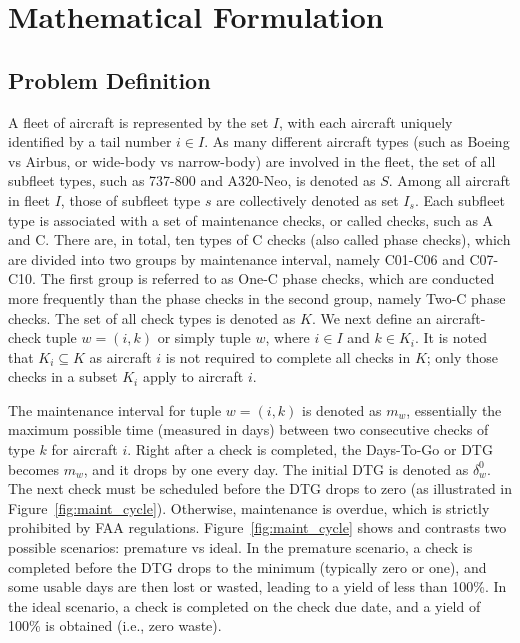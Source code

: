 \section{Mathematical Formulation} 
\label{Problem_definition_formulation}
\subsection{Problem Definition}
A fleet of aircraft is represented by the set $I$, with each aircraft uniquely identified by a tail number $i \in I$. As many different aircraft types (such as Boeing vs Airbus, or wide-body vs narrow-body) are involved in the fleet, the set of all subfleet types, such as 737-800 and A320-Neo, is denoted as $S$. Among all aircraft in fleet $I$, those of subfleet type $s$ are collectively denoted as set $I_s$. Each subfleet type is associated with a set of maintenance checks, or called checks, such as A and C. There are, in total, ten types of C checks (also called phase checks), which are divided into two groups by maintenance interval, namely C01-C06 and C07-C10. The first group is referred to as One-C phase checks, which are conducted more frequently than the phase checks in the second group, namely Two-C phase checks. 
The set of all check types is denoted as $K$. We next define an aircraft-check tuple $w=\left(i,k\right)$ or simply tuple $w$, where $i \in I$ and $k \in K_i$. It is noted that $K_i \subseteq K$ as aircraft $i$ is not required to complete all checks in $K$; only those checks in a subset $K_i$ apply to aircraft $i$.

The maintenance interval for tuple $w=\left(i,k\right)$ is denoted as $m_w$, essentially the maximum possible time (measured in days) between two consecutive checks of type $k$ for aircraft $i$. 
Right after a check is completed, the Days-To-Go or DTG becomes $m_w$,  and it drops by one every day. The initial DTG is denoted as $\delta_w^0$. The next check must be scheduled before the DTG drops to zero (as illustrated in Figure~\ref{fig:maint_cycle}). Otherwise, maintenance is overdue, which is strictly prohibited by FAA regulations. 
Figure~\ref{fig:maint_cycle}  shows and contrasts two possible scenarios: premature vs ideal. In the premature scenario, a check is completed before the DTG drops to the minimum (typically zero or one), and some usable days are then lost or wasted, leading to a yield of less than 100\%. In the ideal scenario, a check is completed on the check due date, and a yield of 100\% is obtained (i.e., zero waste).

